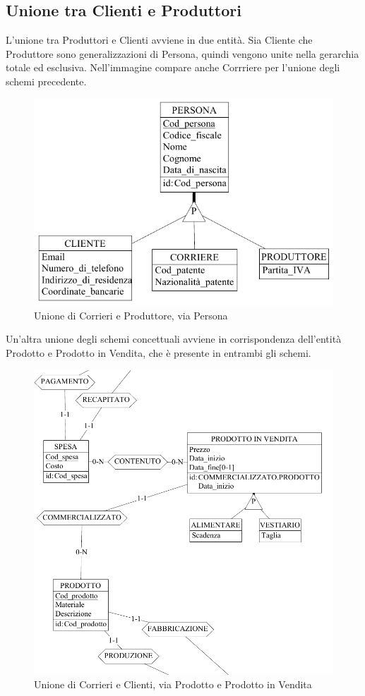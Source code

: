 \documentclass[a4paper,12pt]{report}
\begin{document}
\subsection{Unione tra Clienti e Produttori}

L'unione tra Produttori e Clienti avviene in due entità. Sia Cliente che Produttore sono generalizzazioni di Persona, quindi vengono unite nella gerarchia totale ed esclusiva. Nell'immagine compare anche Corrriere per l'unione degli schemi precedente.
\begin{figure}[H]
	\centering{}
	\includegraphics[width=\textwidth]{img/Unione-Clienti-Produttori1.pdf}
	\caption{Unione di Corrieri e Produttore, via Persona}
\end{figure}
Un'altra unione degli schemi concettuali avviene in corrispondenza dell'entità Prodotto e Prodotto in Vendita, che è presente in entrambi gli schemi. 
\begin{figure}[H]
	\centering{}
	\includegraphics[width=\textwidth]{img/Unione-Clienti-Produttori2.pdf}
	\caption{Unione di Corrieri e Clienti, via Prodotto e Prodotto in Vendita}
\end{figure}
\end{document}
